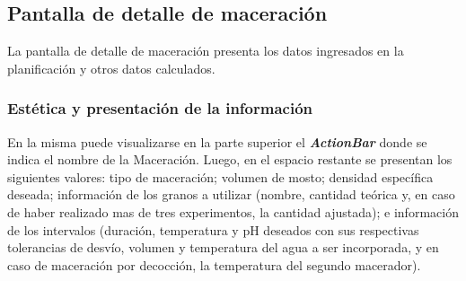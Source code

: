         \subsection{Pantalla de detalle de maceración}
        \label{DescripPantallaDetalleMaceración}
            \par La pantalla de detalle de maceración presenta los datos ingresados en la planificación y otros datos calculados.
            
            \subsubsection{Estética y presentación de la información}
            \par En la misma puede visualizarse en la parte superior el \textbf{\textit{\gls{ActionBar}}} donde se indica el nombre de la Maceración. Luego, en el espacio restante se presentan los siguientes valores: tipo de maceración; volumen de mosto; densidad específica deseada; información de los granos a utilizar (nombre, cantidad teórica y, en caso de haber realizado mas de tres experimentos, la cantidad ajustada); e información de los intervalos (duración, temperatura y pH deseados con sus respectivas tolerancias de desvío, volumen y temperatura del agua a ser incorporada, y en caso de maceración por decocción, la temperatura del segundo macerador).
